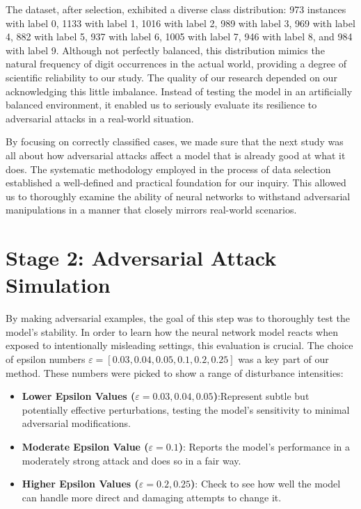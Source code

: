\documentclass[10pt, conference, a4paper, final]{IEEEtran}
\begin{document}
The dataset, after selection, exhibited a diverse class distribution: 973 instances with label 0, 1133 with label 1, 1016 with 
label 2, 989 with label 3, 969 with label 4, 882 with label 5, 937 with label 6, 1005 with label 7, 946 with label 8, and 984 with 
label 9. Although not perfectly balanced, this distribution mimics the natural frequency of digit occurrences in the actual world,
 providing a degree of scientific reliability to our study. The quality of our research depended on our acknowledging this little 
 imbalance. Instead of testing the model in an artificially balanced environment, it enabled us to seriously evaluate its resilience 
 to adversarial attacks in a real-world situation.

By focusing on correctly classified cases, we made sure that the next study was all about how adversarial attacks affect a model 
that is already good at what it does. The systematic methodology employed in the process of data selection established a well-defined 
and practical foundation for our inquiry. This allowed us to thoroughly examine the ability of neural networks to withstand adversarial
 manipulations in a manner that closely mirrors real-world scenarios.

\section{Stage 2: Adversarial Attack Simulation}

By making adversarial examples, the goal of this step was to thoroughly test the model's stability. In order to learn how the neural 
network model reacts when exposed to intentionally misleading settings, this evaluation is crucial.
The choice of epsilon numbers \( \varepsilon = [0.03,0.04,0.05,0.1, 0.2, 0.25] \) was a key part of our method. These numbers were 
picked to show a range of disturbance intensities:
\begin{itemize}
    \item \textbf{Lower Epsilon Values (\( \varepsilon = 0.03, 0.04, 0.05 \))}:Represent subtle but potentially effective perturbations, 
    testing the model's sensitivity to minimal adversarial modifications.
    
    \item \textbf{Moderate Epsilon Value (\( \varepsilon = 0.1 \))}: Reports the model's performance in a moderately strong attack and 
    does so in a fair way.
    \item \textbf{Higher Epsilon Values (\( \varepsilon = 0.2, 0.25 \))}: Check to see how well the model can handle more direct and 
    damaging attempts to change it.
\end{itemize}
\end{document}

